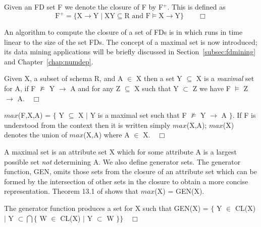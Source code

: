 \medskip
{}
\begin{definition}
\begin{rm}
Given an FD set F we denote the closure of F by F$^+$. 
This is defined as
\begin{displaymath}
\mbox{F}^+ = \{\mbox{X} \to \mbox{Y} \mid \mbox{XY} \subseteq \mbox{R}
\mbox{ and } \mbox{F} \models \mbox{X}
\to \mbox{Y}  \}\quad\quad\Box
\end{displaymath}
\end{rm}
\end{definition}


An algorithm to compute the closure of a set of FDs is in 
\cite{databasefound,atze93} which runs in time linear to the size of
the set FDs. The
concept of a maximal set is now introduced; its data mining
applications will be briefly discussed in
Section~\ref{subsec:fdmining} and Chapter~\ref{chap:numdep}.
\begin{definition}
\begin{rm}
Given X, a subset of schema R, and A $\in$ X then
a set Y $\subseteq$ X is a {\em maximal} set for A, if F
$\not\models$ Y $\to$ A and for any
Z $\subseteq$ X such that Y $\subset$ Z we have F $\models$ Z $\to$
A.$\quad\Box$ 
\end{rm}
\end{definition}

\begin{definition}
\begin{rm}
$max$(F,X,A) = $\{$ Y $\subseteq$ X $\mid$ Y is a maximal set such that
F $\not\models$ Y $\to$ A $\}$.  If F is understood from the context then it
is written simply $max$(X,A); $max$(X) denotes the union of $max$(X,A)
where A $\in$ X.$\quad\Box$
\end{rm}
\end{definition}


A maximal set is an attribute set X which for some attribute A is
a largest possible set {\em not} determining A. We also define
generator sets. The generator function, GEN, omits those sets from the
closure of an attribute set which can be formed by the intersection of
other sets in the closure to obtain a more concise
representation. Theorem 13.1 of \cite{Mann92} shows that $max$(X) = GEN(X).
\begin{definition}\label{def:GEN}
\begin{rm}
The generator function produces a set for X such that
GEN(X) = $\{$ Y $\in$ CL(X) $\mid$ Y $\subset \bigcap \{$ W $\in$
CL(X) $\mid$ Y $\subset$ W $\}\}$$\quad\Box$
\end{rm}
\end{definition}

